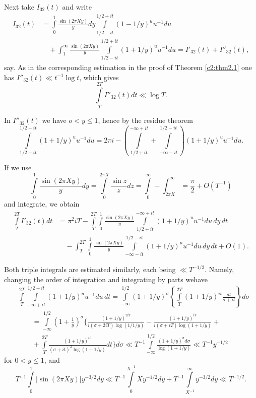 Next take $I_{32}(t)$ and write
\begin{align*}
  I_{32}(t) &= \int\limits_0^1 \frac{\sin(2 \pi Xy)}{y} dy
  \int\limits_{1/2- it}^{1/2 + it} (1- 1/y)^u u^{-1} du\\
  &\quad + \int_1^\infty \frac{\sin (2 \pi Xy)}{y} \int\limits_{1/2 -it}^{1/2
  + it} (1+ 1/y)^u u^{-1}du = I'_{32}(t) + I''_{32} (t),
\end{align*}
say. As in the corresponding estimation in the proof of Theorem
\ref{c2:thm2.1} one has $I''_{32} (t) \ll t^{-1} \log t$, which gives
$$
\int\limits_T^{2T} I''_{32} (t) dt \ll \log T.
$$

In $I''_{32}(t)$ we have $o < y \leq 1$, hence by the residue theorem 
$$
\int\limits_{1/2 -it}^{1/2 + it} (1+ 1/y)^u u^{-1} du = 2 \pi i -
\left(\int\limits_{1/2 + it}^{- \infty + it}+ \int\limits_{- \infty -
  it}^{1/2 - it} \right) (1+ 1/y)^u u^{-1} du.
$$

If we use 
$$
\int\limits_0^1 \frac{\sin (2 \pi X y)}{y}dy = \int\limits^{2  \pi
  X}_0 \frac{\sin z}{z} dz = \int\limits_0^\infty - \int^\infty_{2 \pi
X}  = \frac{\pi}{2} + O (T^{-1})
$$
and integrate, we obtain
\begin{align*}
  \int\limits^{2T}_T I'_{32}(t) dt &= \pi^2 iT - \int\limits_{T}^{2T}
  \int\limits_0^1 \frac{\sin (2 \pi X y)}{y} \int\limits_{1/2 +
    it}^{- \infty+ it} (1+ 1/y)^{u}u^{-1} du\, dy\, dt\\
  &\quad - \int^{2T}_T \int\limits_0^1 \frac{\sin(2 \pi Xy)}{y}
  \int\limits_{- \infty - it}^{1/2 - it} (1+ 1/y)^u u^{-1} du\, dy\, dt + O(1).
\end{align*}

Both triple integrals are estimated similarly, each being $\ll
T^{-1/2}$. \break Namely, changing the order of integration and integrating
by parts we\pageoriginale have
{\fontsize{10}{12}\selectfont
\begin{align*}
  & \int\limits_T^{2T} \int\limits_{-\infty + it}^{1/2 + it} (1+ 1/y)^u
  u^{-1} du\, dt = \int\limits_{-\infty}^{1/2} (1 + 1/y)^{\sigma}
  \left\{ \int\limits_T^{2T} (1+ 1/y)^{it} \frac{dt}{\sigma + it}
  \right\} d \sigma\\
  &\qquad = \int\limits_{- \infty}^{1/2} \left(1+ \frac{1}{y} \right)^\sigma
  \Bigg\{\frac{(1+ 1/y)^{2 iT}}{i(\sigma + 2 iT)\log (1/1/y)} - \frac{(1+
    1/y)^{iT}}{i (\sigma + iT) \log (1+ 1/y)}+\\
  &\qquad + \int\limits_T^{2T} \frac{(1+ 1/y)^{it}}{(\sigma + it)^2 \log (1+
    1/y)}dt \Bigg\} d \sigma \ll T^{-1} \int\limits_{- \infty}^{1/2}
  \frac{(1+ 1/y)^\sigma d \sigma}{\log (1+ 1 /y)} \ll T^{-1} y^{- 1/2}
\end{align*}}
for $0 < y \leq 1$, and 
{\fontsize{10}{12}\selectfont
$$ 
T^{-1} \int\limits_0^1 |\sin (2 \pi X y)|y^{-3/2} dy \ll T^{-1}
\int\limits_0^{X^{-1}}  Xy^{-1/2}dy + T^{-1}
\int\limits^\infty_{X^{-1}} y^{- 3/2} dy \ll T^{-1/2}.
$$}

